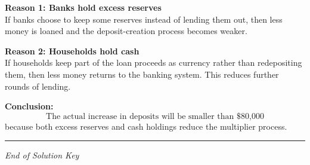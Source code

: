 \documentclass[12pt]{article}
\begin{document}
\textbf{Reason 1: Banks hold excess reserves}\\
If banks choose to keep some reserves instead of lending them out, then less money is loaned and the deposit-creation process becomes weaker.

\textbf{Reason 2: Households hold cash}\\
If households keep part of the loan proceeds as currency rather than redepositing them, then less money returns to the banking system. This reduces further rounds of lending.

\textbf{Conclusion:}
\[
\boxed{\text{The actual increase in deposits will be smaller than \$80{,}000}}
\]
because both excess reserves and cash holdings reduce the multiplier process.

\hrule
\vspace{1em}

\begin{center}
\textit{End of Solution Key}
\end{center}
\end{document}
